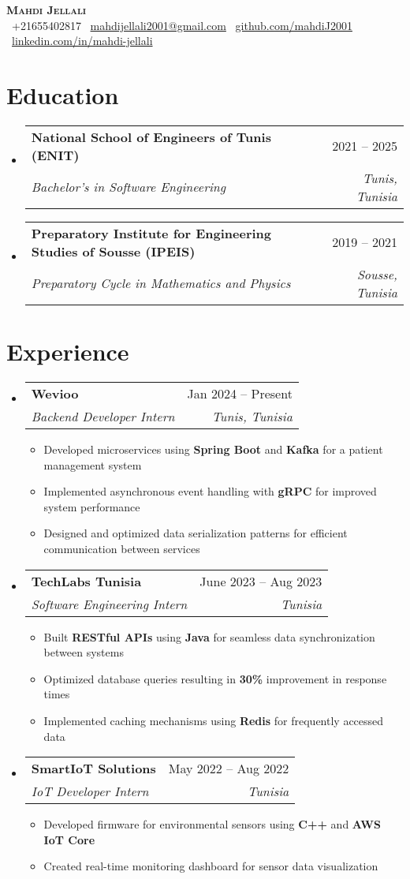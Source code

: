 \documentclass[letterpaper,11pt]{article}
\makeatletter
\newcommand{\resumeItem}[1]{
    \item\small{
            {#1 \vspace{-2pt}}
    }
}
\newcommand{\resumeSubheading}[4]{
    \vspace{-2pt}\item
    \begin{tabular*}{0.97\textwidth}[t]{l@{\extracolsep{\fill}}r}
    \textbf{#1} & #2 \\
    \textit{\small#3} & \textit{\small #4} \\
    \end{tabular*}\vspace{-7pt}
}
\newcommand{\resumeSubHeadingListStart}{\begin{itemize}[leftmargin=0.15in, label={}]}
\newcommand{\resumeSubHeadingListEnd}{\end{itemize}}
\newcommand{\resumeItemListStart}{\begin{itemize}}
\newcommand{\resumeItemListEnd}{\end{itemize}\vspace{-5pt}}
\makeatother
\begin{document}
\begin{center}
\textbf{\Huge \scshape Mahdi Jellali} \\ \vspace{1pt}
\small
\faPhone\ +21655402817 \quad
\faEnvelope\ \href{mailto:mahdijellali2001@gmail.com}{mahdijellali2001@gmail.com} \quad
\faGithub\ \href{https://github.com/mahdiJ2001}{github.com/mahdiJ2001} \quad
\faLinkedin\ \href{https://www.linkedin.com/in/mahdi-jellali/}{linkedin.com/in/mahdi-jellali}
\end{center}

\section{Education}
\resumeSubHeadingListStart
\resumeSubheading
{National School of Engineers of Tunis (ENIT)}{2021 -- 2025}
{Bachelor's in Software Engineering}{Tunis, Tunisia}
\resumeSubheading
{Preparatory Institute for Engineering Studies of Sousse (IPEIS)}{2019 -- 2021}
{Preparatory Cycle in Mathematics and Physics}{Sousse, Tunisia}
\resumeSubHeadingListEnd

\section{Experience}
\resumeSubHeadingListStart
\resumeSubheading
{Wevioo}{Jan 2024 -- Present}
{Backend Developer Intern}{Tunis, Tunisia}
\resumeItemListStart
\resumeItem{Developed microservices using \textbf{Spring Boot} and \textbf{Kafka} for a patient management system}
\resumeItem{Implemented asynchronous event handling with \textbf{gRPC} for improved system performance}
\resumeItem{Designed and optimized data serialization patterns for efficient communication between services}
\resumeItemListEnd

\resumeSubheading
{TechLabs Tunisia}{June 2023 -- Aug 2023}
{Software Engineering Intern}{Tunisia}
\resumeItemListStart
\resumeItem{Built \textbf{RESTful APIs} using \textbf{Java} for seamless data synchronization between systems}
\resumeItem{Optimized database queries resulting in \textbf{30\%} improvement in response times}
\resumeItem{Implemented caching mechanisms using \textbf{Redis} for frequently accessed data}
\resumeItemListEnd

\resumeSubheading
{SmartIoT Solutions}{May 2022 -- Aug 2022}
{IoT Developer Intern}{Tunisia}
\resumeItemListStart
\resumeItem{Developed firmware for environmental sensors using \textbf{C++} and \textbf{AWS IoT Core}}
\resumeItem{Created real-time monitoring dashboard for sensor data visualization}
\resumeItemListEnd
\resumeSubHeadingListEnd
\end{document}
